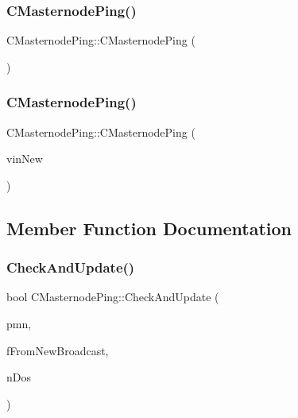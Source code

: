 \subsubsection{\texorpdfstring{C\+Masternode\+Ping()}{CMasternodePing()}\hspace{0.1cm}{\footnotesize\ttfamily [1/2]}}
{\footnotesize\ttfamily C\+Masternode\+Ping\+::\+C\+Masternode\+Ping (\begin{DoxyParamCaption}{ }\end{DoxyParamCaption})\hspace{0.3cm}{\ttfamily [inline]}}

\mbox{\label{class_c_masternode_ping_ac8a5d95897b478e07f9b193e8f73ffc9}} 
\subsubsection{\texorpdfstring{C\+Masternode\+Ping()}{CMasternodePing()}\hspace{0.1cm}{\footnotesize\ttfamily [2/2]}}
{\footnotesize\ttfamily C\+Masternode\+Ping\+::\+C\+Masternode\+Ping (\begin{DoxyParamCaption}\item[{C\+Tx\+In \&}]{vin\+New }\end{DoxyParamCaption})}



\subsection{Member Function Documentation}
\mbox{\label{class_c_masternode_ping_aea819a2b1c729374143f60b3d42e003d}} 
\subsubsection{\texorpdfstring{Check\+And\+Update()}{CheckAndUpdate()}}
{\footnotesize\ttfamily bool C\+Masternode\+Ping\+::\+Check\+And\+Update (\begin{DoxyParamCaption}\item[{\mbox{\hyperlink{class_c_masternode}{C\+Masternode}} $\ast$}]{pmn,  }\item[{bool}]{f\+From\+New\+Broadcast,  }\item[{int \&}]{n\+Dos }\end{DoxyParamCaption})}

